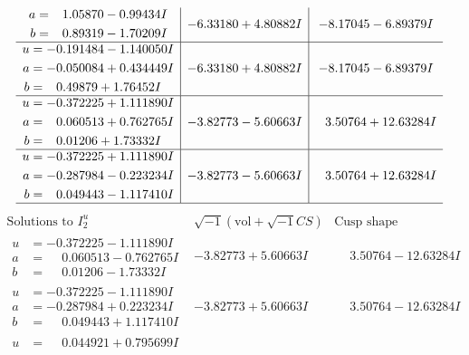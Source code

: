 \documentclass[1p]{elsarticle_modified}
\theoremstyle{definition}
\newcommand{\I}{\sqrt{-1}}
\begin{document}
$$\begin{array}{c|c|c}
\begin{aligned}
a &= \phantom{-}1.05870 - 0.99434 I \\
b &= \phantom{-}0.89319 - 1.70209 I\end{aligned}
 & -6.33180 + 4.80882 I & -8.17045 - 6.89379 I \\ \hline\begin{aligned}
u &= -0.191484 - 1.140050 I \\
a &= -0.050084 + 0.434449 I \\
b &= \phantom{-}0.49879 + 1.76452 I\end{aligned}
 & -6.33180 + 4.80882 I & -8.17045 - 6.89379 I \\ \hline\begin{aligned}
u &= -0.372225 + 1.111890 I \\
a &= \phantom{-}0.060513 + 0.762765 I \\
b &= \phantom{-}0.01206 + 1.73332 I\end{aligned}
 & -3.82773 - 5.60663 I & \phantom{-}3.50764 + 12.63284 I \\ \hline\begin{aligned}
u &= -0.372225 + 1.111890 I \\
a &= -0.287984 - 0.223234 I \\
b &= \phantom{-}0.049443 - 1.117410 I\end{aligned}
 & -3.82773 - 5.60663 I & \phantom{-}3.50764 + 12.63284 I\\
 \hline 
 \end{array}$$\newpage$$\begin{array}{c|c|c}  
\text{Solutions to }I^u_{2}& \I (\text{vol} + \sqrt{-1}CS) & \text{Cusp shape}\\
 \hline 
\begin{aligned}
u &= -0.372225 - 1.111890 I \\
a &= \phantom{-}0.060513 - 0.762765 I \\
b &= \phantom{-}0.01206 - 1.73332 I\end{aligned}
 & -3.82773 + 5.60663 I & \phantom{-}3.50764 - 12.63284 I \\ \hline\begin{aligned}
u &= -0.372225 - 1.111890 I \\
a &= -0.287984 + 0.223234 I \\
b &= \phantom{-}0.049443 + 1.117410 I\end{aligned}
 & -3.82773 + 5.60663 I & \phantom{-}3.50764 - 12.63284 I \\ \hline\begin{aligned}
u &= \phantom{-}0.044921 + 0.795699 I \\

\end{aligned}
\end{array}$$
\end{document}
